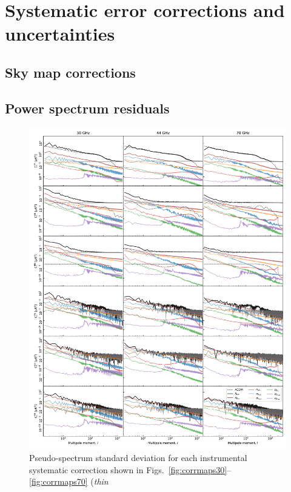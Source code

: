 \documentclass[twocolumn]{../../common/aa}
\begin{document}
\clearpage
\section{Systematic error corrections and uncertainties}
\label{sec:systematics}

\subsection{Sky map corrections}



\subsection{Power spectrum residuals}

\begin{figure}
  \center	
  \includegraphics[width=0.98\linewidth]{figures/components_power_spectrum_std_masked.pdf}
  \caption{Pseudo-spectrum standard deviation for each instrumental
    systematic correction shown in
    Figs.~\ref{fig:corrmaps30}--\ref{fig:corrmaps70} (\emph{thin
}}
\end{figure}
\end{document}
